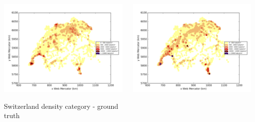 \documentclass[c]{beamer}
\begin{document}
\begin{frame}
\begin{columns}
 \begin{column}{0.5\textwidth}
  \begin{overlayarea}{\linewidth}{4cm}
    \centering\vfill
    \includegraphics[scale=0.50]{images/Switzerland/density_ground_truth.png}
  \end{overlayarea}
  \begin{overlayarea}{\linewidth}{0.5cm}
    \centering
    \tiny Switzerland density category - ground truth\par
  \end{overlayarea}
 \end{column}
 \begin{column}{0.5\textwidth}
  \begin{overlayarea}{\linewidth}{4cm}
    \centering\vfill
    \includegraphics[scale=0.50]{images/Switzerland/nn/density_classification.png}

\end{overlayarea}
\end{column}
\end{columns}
\end{frame}
\end{document}

